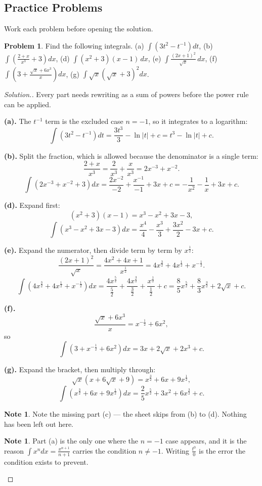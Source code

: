 \documentclass[11pt,a4paper]{article}
\theoremstyle{definition}
\newtheorem{note}[thm]{Note}
\newtheorem{problemx}{Problem}[section]
\newenvironment{problem}{\begin{problemx}}{\end{problemx}}
\newenvironment{solution}
  {\renewcommand{\qedsymbol}{}\begin{proof}[\textit{Solution}.]}
  {\end{proof}}
\begin{document}
\subsection{Practice Problems}

Work each problem before opening the solution.

\begin{problem}
Find the following integrals.
\quad (a) $\int\left(3t^2-t^{-1}\right)dt$, \quad
(b) $\int\left(\frac{2+x}{x^3}+3\right)dx$, \quad
(d) $\int\left(x^2+3\right)(x-1)\,dx$, \quad
(e) $\int\frac{(2x+1)^2}{\sqrt{x}}\,dx$, \quad
(f) $\int\left(3+\frac{\sqrt{x}+6x^3}{x}\right)dx$, \quad
(g) $\int\sqrt{x}\left(\sqrt{x}+3\right)^2dx$.
\end{problem}

\begin{solution}
Every part needs rewriting as a sum of powers before the power rule can be applied.

\textbf{(a).} The $t^{-1}$ term is the excluded case $n=-1$, so it integrates to a
logarithm:
$$\int\left(3t^2-t^{-1}\right)dt=\frac{3t^3}{3}-\ln|t|+c=t^3-\ln|t|+c.$$

\textbf{(b).} Split the fraction, which is allowed because the denominator is a single
term:
$$\frac{2+x}{x^3}=\frac{2}{x^3}+\frac{x}{x^3}=2x^{-3}+x^{-2}.$$
$$\int\left(2x^{-3}+x^{-2}+3\right)dx=\frac{2x^{-2}}{-2}+\frac{x^{-1}}{-1}+3x+c
=-\frac{1}{x^2}-\frac{1}{x}+3x+c.$$

\textbf{(d).} Expand first:
$$\left(x^2+3\right)(x-1)=x^3-x^2+3x-3,$$
$$\int\left(x^3-x^2+3x-3\right)dx=\frac{x^4}{4}-\frac{x^3}{3}+\frac{3x^2}{2}-3x+c.$$

\textbf{(e).} Expand the numerator, then divide term by term by $x^{\frac{1}{2}}$:
$$\frac{(2x+1)^2}{\sqrt{x}}=\frac{4x^2+4x+1}{x^{\frac{1}{2}}}
=4x^{\frac{3}{2}}+4x^{\frac{1}{2}}+x^{-\frac{1}{2}}.$$
$$\int\left(4x^{\frac{3}{2}}+4x^{\frac{1}{2}}+x^{-\frac{1}{2}}\right)dx
=\frac{4x^{\frac{5}{2}}}{\frac{5}{2}}+\frac{4x^{\frac{3}{2}}}{\frac{3}{2}}
+\frac{x^{\frac{1}{2}}}{\frac{1}{2}}+c
=\frac{8}{5}x^{\frac{5}{2}}+\frac{8}{3}x^{\frac{3}{2}}+2\sqrt{x}+c.$$

\textbf{(f).}
$$\frac{\sqrt{x}+6x^3}{x}=x^{-\frac{1}{2}}+6x^2,$$
so
$$\int\left(3+x^{-\frac{1}{2}}+6x^2\right)dx=3x+2\sqrt{x}+2x^3+c.$$

\textbf{(g).} Expand the bracket, then multiply through:
$$\sqrt{x}\left(x+6\sqrt{x}+9\right)=x^{\frac{3}{2}}+6x+9x^{\frac{1}{2}},$$
$$\int\left(x^{\frac{3}{2}}+6x+9x^{\frac{1}{2}}\right)dx
=\frac{2}{5}x^{\frac{5}{2}}+3x^2+6x^{\frac{3}{2}}+c.$$

\begin{note}
Note the missing part (c) --- the sheet skips from (b) to (d). Nothing has been left
out here.
\end{note}

\begin{note}
Part (a) is the only one where the $n=-1$ case appears, and it is the reason
$\int x^n dx=\frac{x^{n+1}}{n+1}$ carries the condition $n\neq -1$. Writing
$\frac{t^0}{0}$ is the error the condition exists to prevent.
\end{note}
\end{solution}
\end{document}
